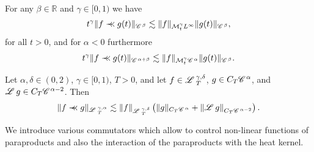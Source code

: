 \begin{appendices}
\begin{lemma}
  \begin{enumeratealpha}
    \item For any $\beta \in \mathbb{R}$ and $\gamma \in [0, 1)$ we have
    \begin{equation}
      \label{eq:mod para-1} t^{\gamma} \|f \prec\!\!\!\prec g (t) \|_{\mathscr{C} \hspace{.1em}^{\beta}}
      \lesssim \|f\|_{\mathcal{M}^{\gamma}_t L^{\infty}} \|g (t)
      \|_{\mathscr{C} \hspace{.1em}^{\beta}},
    \end{equation}
    for all $t > 0$, and for $\alpha < 0$ furthermore
    \begin{equation}
      \label{eq:mod para-2} t^{\gamma} \|f \prec\!\!\!\prec g (t) \|_{\mathscr{C} \hspace{.1em}^{\alpha +
      \beta}} \lesssim \|f\|_{\mathcal{M}^{\gamma}_t \mathscr{C} \hspace{.1em}^{\alpha}} \|g (t)
      \|_{\mathscr{C} \hspace{.1em}^{\beta}} .
    \end{equation}
    \item Let $\alpha, \delta \in (0, 2)$, $\gamma \in [0, 1)$, $T > 0$, and
    let $f \in \mathscr{L} \hspace{.2em}_T^{\gamma, \delta}$, $g \in C_T \mathscr{C} \hspace{.1em}^{\alpha}$, and $\mathscr{L} \hspace{.2em} g
    \in C_T \mathscr{C} \hspace{.1em}^{\alpha - 2}$. Then
    \begin{equation}
      \| f \prec\!\!\!\prec g \|_{\mathscr{L} \hspace{.2em}^{\gamma, \alpha}_T} \lesssim \| f
      \|_{\mathscr{L} \hspace{.2em}^{\gamma, \delta}_T} \left( \| g \|_{C_T \mathscr{C} \hspace{.1em}^{\alpha}} + \left\|
      \mathscr{L} \hspace{.2em} g \right\|_{C_T \mathscr{C} \hspace{.1em}^{\alpha - 2}} \right) .
      \label{eq:mod-para-parabolic-est}
    \end{equation}
  \end{enumeratealpha}
\end{lemma}

We introduce various commutators which allow to control non-linear functions
of paraproducts and also the interaction of the paraproducts with the heat
kernel.

\begin{lemma}
  \label{lem:all-commutators}{\tmdummy}
  

\end{lemma}
\end{appendices}

